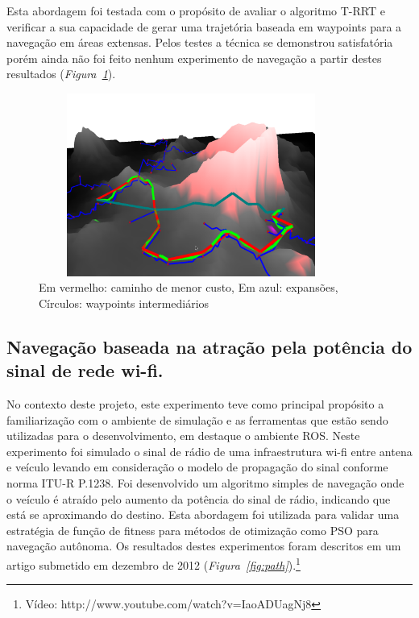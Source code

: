 \documentclass{article}
\newcommand{\foot}[1]{\footnote{	\fontfamily{cmss}\selectfont\footnotesize{#1}}}
\newcommand{\fig}[1]{\textit{Figura~\ref{#1}}}
\begin{document}
Esta abordagem foi testada com o propósito de avaliar o algoritmo T-RRT e
verificar a sua capacidade de gerar uma trajetória baseada em waypoints para a
navegação em áreas extensas. Pelos testes a técnica se demonstrou satisfatória
porém ainda não foi feito nenhum experimento de navegação a partir destes
resultados (\fig{fig:rrt}).

\begin{figure}[ht]
	\begin{minipage}[b]{1\linewidth}
	    \centering
	    \includegraphics[width=10cm,height=6cm]{../images/rrt_2.png}
	 	\caption{Em vermelho: caminho de menor custo, Em azul: expansões, Círculos:
	 	waypoints intermediários}
	 	\label{fig:rrt}
	\end{minipage}
\end{figure}


\subsection{Navegação baseada na atração pela potência do sinal de rede wi-fi.}

No contexto deste projeto, este experimento teve como principal propósito a
familiarização com o ambiente de simulação e as ferramentas que estão sendo
utilizadas para o desenvolvimento, em destaque o ambiente ROS. Neste experimento
foi simulado o sinal de rádio de uma infraestrutura wi-fi entre antena e veículo
levando em consideração o modelo de propagação do sinal conforme norma ITU-R
P.1238. Foi desenvolvido um algoritmo simples de navegação onde o veículo é
atraído pelo aumento da potência do sinal de rádio, indicando que está se
aproximando do destino. Esta abordagem foi utilizada para validar uma estratégia
de função de fitness para métodos de otimização como PSO para navegação
autônoma. Os resultados destes experimentos foram descritos em um artigo
submetido em dezembro de 2012 (\fig{fig:path}).\foot{Vídeo:
http://www.youtube.com/watch?v=IaoADUagNj8}
\end{document}
